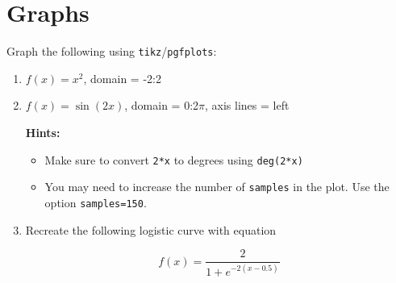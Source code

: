 \section{Graphs}
Graph the following using \texttt{tikz}/\texttt{pgfplots}:
\begin{enumerate}
\item \( f(x)=x^2 \), domain = -2:2
\item \( f(x) = \sin(2x)  \), domain = 0:2$\pi$, axis lines = left

\begin{figure}[h]\centering
{}
\end{figure}

\textbf{Hints:}
\begin{itemize}
    \item Make sure to convert \verb|2*x| to degrees using \verb|deg(2*x)|
    \item You may need to increase the number of \texttt{samples} in the plot. Use the option \texttt{samples=150}. 
\end{itemize}
\clearpage
\item Recreate the following logistic curve with equation
\begin{figure}[h]
\centering
\begin{minipage}{0.35\textwidth}
    \begin{equation*}
        f(x) = \frac{2}{1+e^{-2(x-0.5)}}    
    \end{equation*}
\end{minipage}
\begin{minipage}{0.60\textwidth}
\end{minipage}
\end{figure}


\end{enumerate}
